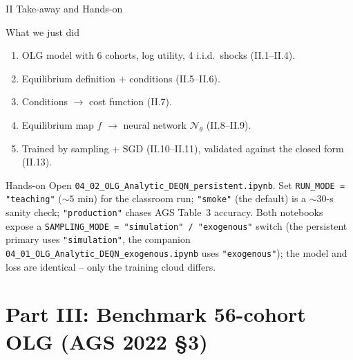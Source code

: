 \documentclass[aspectratio=169,11pt]{beamer}
\newcommand{\emphc}[1]{\textcolor{harvardcrimson}{#1}}
\newcommand{\N}{\mathcal{N}}
\begin{document}
\begin{frame}{II Take-away and Hands-on}
\footnotesize
\begin{block}{What we just did}
\begin{enumerate}\itemsep1pt
    \item OLG model with 6 cohorts, log utility, 4 i.i.d.\ shocks (II.1--II.4).
    \item Equilibrium definition + conditions (II.5--II.6).
    \item Conditions $\to$ \emphc{cost function} (II.7).
    \item Equilibrium map $f$ $\to$ neural network $\N_\theta$ (II.8--II.9).
    \item Trained by sampling + SGD (II.10--II.11), \emphc{validated} against the closed form (II.13).
\end{enumerate}
\end{block}

\begin{block}{Hands-on}
Open \texttt{04\_02\_OLG\_Analytic\_DEQN\_persistent.ipynb}.  Set \texttt{RUN\_MODE = "teaching"} ($\sim 5$ min) for the classroom run; \texttt{"smoke"} (the default) is a $\sim$30-s sanity check; \texttt{"production"} chases AGS Table~3 accuracy.  Both notebooks expose a \texttt{SAMPLING\_MODE = "simulation" / "exogenous"} switch (the persistent primary uses \texttt{"simulation"}, the companion \texttt{04\_01\_OLG\_Analytic\_DEQN\_exogenous.ipynb} uses \texttt{"exogenous"}); the model and loss are identical -- only the training cloud differs.
\end{block}
\end{frame}



\section{Part III: Benchmark 56-cohort OLG (AGS 2022 \S 3)}
\end{document}
